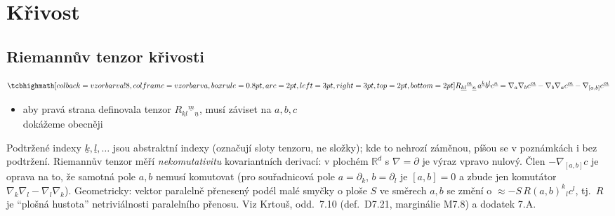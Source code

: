 \providecommand{\gmIjedenactAu}[1]{\underline{#1}}
\providecommand{\gmIjedenactAR}{\mathbb{R}}
\providecommand{\gmIjedenactAd}{\mathfrak{d}}
\providecommand{\gmIjedenactAx}[1]{\tikz[baseline=(X.base)]{\node[inner sep=0pt](X){$\displaystyle #1$};\draw[gray](X.south west)--(X.north east);}}

\section{Křivost}

\subsection*{Riemannův tenzor křivosti}
\begin{definice}
\[
  \vzorec{R_{\gmIjedenactAu{kl}}{}^{\gmIjedenactAu{m}}{}_{\gmIjedenactAu{n}}\,a^{\gmIjedenactAu{k}}b^{\gmIjedenactAu{l}}c^{\gmIjedenactAu{n}}
  = \nabla_a\nabla_b c^{\gmIjedenactAu{m}} - \nabla_b\nabla_a c^{\gmIjedenactAu{m}} - \nabla_{[a,b]}c^{\gmIjedenactAu{m}}}
\]
\end{definice}
\begin{itemize}[nosep]
  \item aby pravá strana definovala tenzor $R_{\gmIjedenactAu{kl}}{}^{\gmIjedenactAu{m}}{}_{\gmIjedenactAu{n}}$, musí záviset na $a,b,c$  \\
        dokážeme obecněji
\end{itemize}

\begin{vysvetleni}
Podtržené indexy $\gmIjedenactAu{k},\gmIjedenactAu{l},\dots$ jsou abstraktní indexy (označují sloty tenzoru, ne složky); kde to nehrozí záměnou, píšou se v poznámkách i bez podtržení. Riemannův tenzor měří \emph{nekomutativitu} kovariantních derivací: v plochém $\mathbb{R}^d$ s $\nabla=\partial$ je výraz vpravo nulový. Člen $-\nabla_{[a,b]}c$ je oprava na to, že samotná pole $a,b$ nemusí komutovat (pro souřadnicová pole $a=\partial_k$, $b=\partial_l$ je $[a,b]=0$ a zbude jen komutátor $\nabla_k\nabla_l-\nabla_l\nabla_k$).
Geometricky: vektor paralelně přenesený podél malé smyčky o ploše $S$ ve směrech $a,b$ se změní o $\approx -S\,R(a,b)^{k}{}_{l}c^{l}$, tj.\ $R$ je ``plošná hustota'' netriviálnosti paralelního přenosu.
Viz Krtouš, odd.\ 7.10 (def.\ D7.21, marginálie M7.8) a dodatek 7.A.
\end{vysvetleni}

